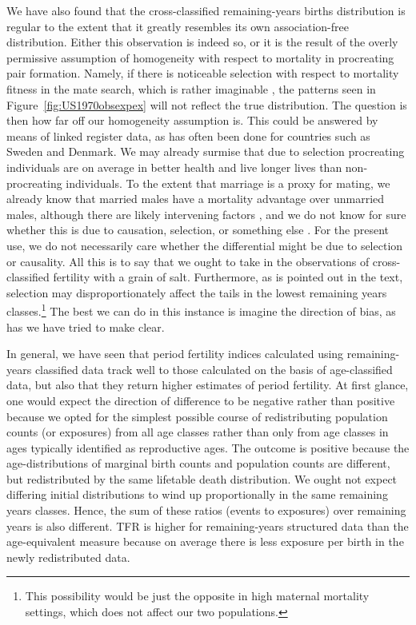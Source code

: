 We have also found that the cross-classified remaining-years births distribution
is regular to the extent that it greatly resembles its own association-free
distribution. Either this observation is indeed so, or it is the result of the
overly permissive assumption of homogeneity with respect to mortality in
procreating pair formation. Namely, if there is noticeable selection with
respect to mortality fitness in the mate search, which is rather imaginable
\citep{gangestad1993pathogen, roberts2008good}, the patterns seen in
Figure~\ref{fig:US1970obsexpex} will not reflect the true distribution. The
question is then how far off our homogeneity assumption is. This could be
answered by means of linked register data, as has often been done for countries
such as Sweden and Denmark. We may already surmise that due to
selection procreating individuals are on average in better health and live
longer lives than non-procreating individuals. To the extent that marriage 
is a proxy for mating, we already know that married males have a
mortality advantage over unmarried males, although
there are likely intervening factors \citep[see
e.g.,][]{rogers1995marriage, waite1995does}, and we do not know for sure whether
this is due to causation, selection, or something else \citep[see
e.g.,][]{goldman1993marriage}. For the present use, we do not necessarily care 
whether the differential might be due to
selection or causality. All this is to say that we ought to take in the
observations of cross-classified fertility with a grain of salt. Furthermore, as
is pointed out in the text, selection may disproportionately affect the tails 
in the lowest remaining years classes.\footnote{This possibility would be just
the opposite in high maternal mortality settings, which does not affect
our two populations.} The best we can do in this instance is imagine the
direction of bias, as has we have tried to make clear.

In general, we have seen that period fertility indices calculated using
remaining-years classified data track well to those calculated on
the basis of age-classified data, but also that they return higher estimates of
period fertility. At first glance, one would expect the direction of difference to be negative 
rather than positive because we opted for the simplest possible course of
redistributing population counts (or exposures) from all age classes rather than
only from age classes in ages typically identified as reproductive ages. The
outcome is positive because the age-distributions of marginal birth counts and
population counts are different, but redistributed by the same lifetable death
distribution. We ought not expect differing initial distributions to wind up
proportionally in the same remaining years classes. Hence, the sum of these
ratios (events to exposures) over remaining years is also different. TFR is higher for remaining-years structured data than the age-equivalent
measure because on average there is less exposure per birth in the newly
redistributed data.

